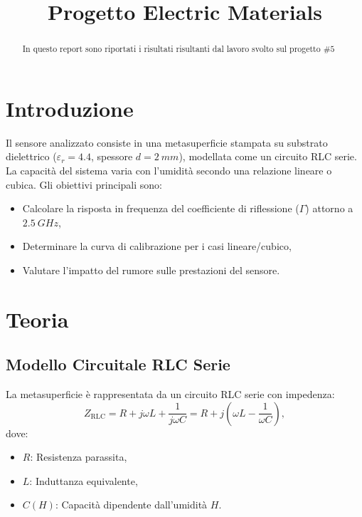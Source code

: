 \documentclass[conference]{IEEEtran}
\begin{document}
\title{Progetto Electric Materials}

\author{
}


\maketitle

\begin{abstract}
In questo report sono riportati i risultati risultanti dal lavoro svolto sul progetto $\#5$
\end{abstract}


\section{Introduzione}
Il sensore analizzato consiste in una metasuperficie stampata su substrato dielettrico  (\(\varepsilon_r = 4.4\), spessore \(d = \SI{2}{mm}\)), modellata come un circuito RLC serie. La capacità del sistema varia con l'umidità secondo una relazione lineare o cubica. Gli obiettivi principali sono:
\begin{itemize}
    \item Calcolare la risposta in frequenza del coefficiente di riflessione (\(\Gamma\)) attorno a \(\SI{2.5}{GHz}\),
    \item Determinare la curva di calibrazione per i casi lineare/cubico,
    \item Valutare l'impatto del rumore sulle prestazioni del sensore.
\end{itemize}


\section{Teoria}
\subsection{Modello Circuitale RLC Serie}
La metasuperficie è rappresentata da un circuito RLC serie con impedenza:
\begin{equation}
    Z_{\text{RLC}} = R + j\omega L + \frac{1}{j\omega C} = R + j\left(\omega L - \frac{1}{\omega C}\right),
\end{equation}
dove:
\begin{itemize}
    \item \(R \): Resistenza parassita,
    \item \(L \): Induttanza equivalente,
    \item \(C(H)\): Capacità dipendente dall'umidità \(H\).
\end{itemize}
\end{document}
